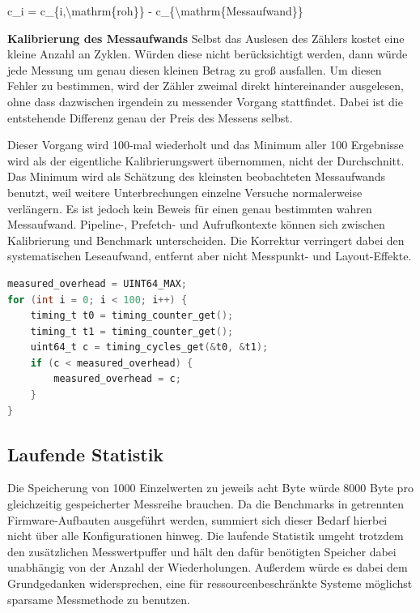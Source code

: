 c\_i = c\_\{i,\textbackslash{}mathrm\{roh\}\} - c\_\{\textbackslash{}mathrm\{Messaufwand\}\}

\textbf{Kalibrierung des Messaufwands }Selbst das Auslesen des Z{\"a}hlers kostet eine kleine Anzahl an Zyklen. W{\"u}rden diese nicht ber{\"u}cksichtigt werden, dann w{\"u}rde jede Messung um genau diesen kleinen Betrag zu gro{\ss} ausfallen. Um diesen Fehler zu bestimmen, wird der Z{\"a}hler zweimal direkt hintereinander ausgelesen, ohne dass dazwischen irgendein zu messender Vorgang stattfindet. Dabei ist die entstehende Differenz genau der Preis des Messens selbst.

Dieser Vorgang wird 100-mal wiederholt und das Minimum aller 100 Ergebnisse wird als der eigentliche Kalibrierungswert {\"u}bernommen, nicht der Durchschnitt. Das Minimum wird als Sch{\"a}tzung des kleinsten beobachteten Messaufwands benutzt, weil weitere Unterbrechungen einzelne Versuche normalerweise verl{\"a}ngern. Es ist jedoch kein Beweis f{\"u}r einen genau bestimmten wahren Messaufwand. Pipeline-, Prefetch- und Aufrufkontexte k{\"o}nnen sich zwischen Kalibrierung und Benchmark unterscheiden. Die Korrektur verringert dabei den systematischen Leseaufwand, entfernt aber nicht Messpunkt- und Layout-Effekte.

\begin{lstlisting}[style=basecode,language=C]
measured_overhead = UINT64_MAX;
for (int i = 0; i < 100; i++) {
    timing_t t0 = timing_counter_get();
    timing_t t1 = timing_counter_get();
    uint64_t c = timing_cycles_get(&t0, &t1);
    if (c < measured_overhead) {
        measured_overhead = c;
    }
}
\end{lstlisting}
\subsection{Laufende Statistik}
Die Speicherung von 1000 Einzelwerten zu jeweils acht Byte w{\"u}rde 8000 Byte pro gleichzeitig gespeicherter Messreihe brauchen. Da die Benchmarks in getrennten Firmware-Aufbauten ausgef{\"u}hrt werden, summiert sich dieser Bedarf hierbei nicht {\"u}ber alle Konfigurationen hinweg. Die laufende Statistik umgeht trotzdem den zus{\"a}tzlichen Messwertpuffer und h{\"a}lt den daf{\"u}r ben{\"o}tigten Speicher dabei unabh{\"a}ngig von der Anzahl der Wiederholungen. Au{\ss}erdem w{\"u}rde es dabei dem Grundgedanken widersprechen, eine f{\"u}r ressourcenbeschr{\"a}nkte Systeme m{\"o}glichst sparsame Messmethode zu benutzen.

